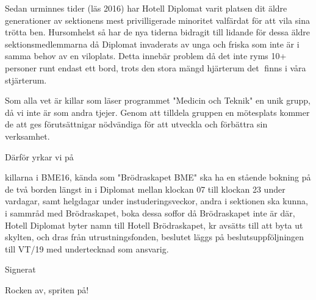 \documentclass[../_main/handlingar.tex]{subfiles}
\begin{document}
Sedan urminnes tider (läs 2016) har Hotell Diplomat varit platsen dit äldre
generationer av sektionens mest privilligerade minoritet valfärdat för att vila
sina trötta ben. Hursomhelst så har de nya tiderna bidragit till lidande för
dessa äldre sektionsmedlemmarna då Diplomat invaderats av unga och friska
som inte är i samma behov av en viloplats. Detta innebär problem då det inte
ryms 10+ personer runt endast ett bord, trots den stora mängd hjärterum det
finns i våra stjärterum.

Som alla vet är killar som läser programmet "Medicin och Teknik" en unik
grupp, då vi inte är som andra tjejer. Genom att tilldela gruppen en mötesplats
kommer de att ges förutsättnigar nödvändiga för att utveckla och förbättra sin
verksamhet.

Därför yrkar vi på
\begin{attsatser}
  \att killarna i BME16, kända som "Brödraskapet BME" ska ha en stående
  bokning på de två borden längst in i Diplomat mellan klockan 07 till klockan
  23 under vardagar, samt helgdagar under instuderingsveckor,
  \att andra i sektionen ska kunna, i sammråd med Brödraskapet, boka dessa
  soffor då Brödraskapet inte är där,
  \att Hotell Diplomat byter namn till Hotell Brödraskapet,
   kr avsätts till att byta ut skylten, och dras från utrustningsfonden,
  \att beslutet läggs på beslutsuppföljningen till VT/19 med undertecknad som ansvarig.

\end{attsatser}

\begin{signatures}{1}
    Signerat
    \signature{Brödraskapet BME}{Rocken av, spriten på!}

\end{signatures}
\end{document}
